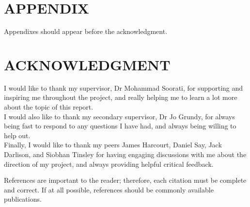 \documentclass[letterpaper, 10 pt, conference]{ieeeconf}  %
\begin{document}






\section*{APPENDIX}

Appendixes should appear before the acknowledgment.

\section*{ACKNOWLEDGMENT}

I would like to thank my supervisor, Dr Mohammad Soorati, for supporting and inspiring me throughout the project, and really helping me to learn a lot more about the topic of this report.\\

I would also like to thank my secondary supervisor, Dr Jo Grundy, for always being fast to respond to any questions I have had, and always being willing to help out.\\

Finally, I would like to thank my peers James Harcourt, Daniel Say, Jack Darlison, and Siobhan Tinsley for having engaging discussions with me about the direction of my project, and always providing helpful critical feedback.




References are important to the reader; therefore, each citation must be complete and correct. If at all possible, references should be commonly available publications.




{}
\end{document}
